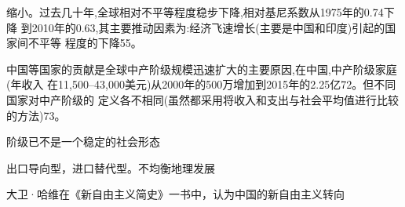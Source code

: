 缩小。过去几十年,全球相对不平等程度稳步下降,相对基尼系数从1975年的0.74下降
到2010年的0.63,其主要推动因素为:经济飞速增长(主要是中国和印度)引起的国家间不平等
程度的下降55。

中国等国家的贡献是全球中产阶级规模迅速扩大的主要原因,在中国,中产阶级家庭(年收入
在11,500–43,000美元)从2000年的500万增加到2015年的2.25亿72。但不同国家对中产阶级的
定义各不相同(虽然都采用将收入和支出与社会平均值进行比较的方法)73。

阶级已不是一个稳定的社会形态



出口导向型，进口替代型。不均衡地理发展


大卫·哈维在《新自由主义简史》一书中，认为中国的新自由主义转向

